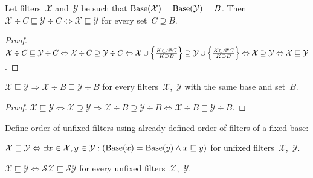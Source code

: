 \begin{lem}
Let filters~$\mathcal{X}$
and~$\mathcal{Y}$ be such that
$\operatorname{Base}(\mathcal{X})=\operatorname{Base}(\mathcal{Y})=B$. Then
$\mathcal{X}\div C\sqsubseteq\mathcal{Y}\div C
\Leftrightarrow \mathcal{X}\sqsubseteq\mathcal{Y}$ for every
set~$C\supseteq B$.
\end{lem}

\begin{proof}
$\mathcal{X}\div C\sqsubseteq\mathcal{Y}\div C\Leftrightarrow
\mathcal{X}\div C\supseteq\mathcal{Y}\div C\Leftrightarrow
\mathcal{X}\cup\left\{ \frac{K\in\mathscr{P} C}{K\supseteq B}\right\} \supseteq \mathcal{Y}\cup\left\{ \frac{K\in\mathscr{P} C}{K\supseteq B}\right\} \Leftrightarrow
\mathcal{X}\supseteq\mathcal{Y} \Leftrightarrow
\mathcal{X}\sqsubseteq\mathcal{Y}$.
\end{proof}

\begin{prop}
$\mathcal{X}\sqsubseteq\mathcal{Y} \Rightarrow
\mathcal{X}\div B\sqsubseteq\mathcal{Y}\div B$ for every
filters~$\mathcal{X}$,~$\mathcal{Y}$ with the same base
and set~$B$.
\end{prop}

\begin{proof}
$\mathcal{X}\sqsubseteq\mathcal{Y} \Leftrightarrow
\mathcal{X}\supseteq\mathcal{Y} \Rightarrow
\mathcal{X}\div B\supseteq\mathcal{Y}\div B \Leftrightarrow
\mathcal{X}\div B\sqsubseteq\mathcal{Y}\div B$.
\end{proof}

Define order of unfixed filters using already defined order
of filters of a fixed base:

\begin{defn}
$\mathcal{X}\sqsubseteq\mathcal{Y} \Leftrightarrow
\exists x\in\mathcal{X},y\in\mathcal{Y}:
(\operatorname{Base}(x)=\operatorname{Base}(y)\land x\sqsubseteq y)$ for unfixed
filters~$\mathcal{X}$,~$\mathcal{Y}$.
\end{defn}

\begin{lem}
$\mathcal{X}\sqsubseteq\mathcal{Y} \Leftrightarrow
\mathscr{S}\mathcal{X}\sqsubseteq\mathscr{S}\mathcal{Y}$
for every unfixed filters~$\mathcal{X}$,~$\mathcal{Y}$.
\end{lem}


